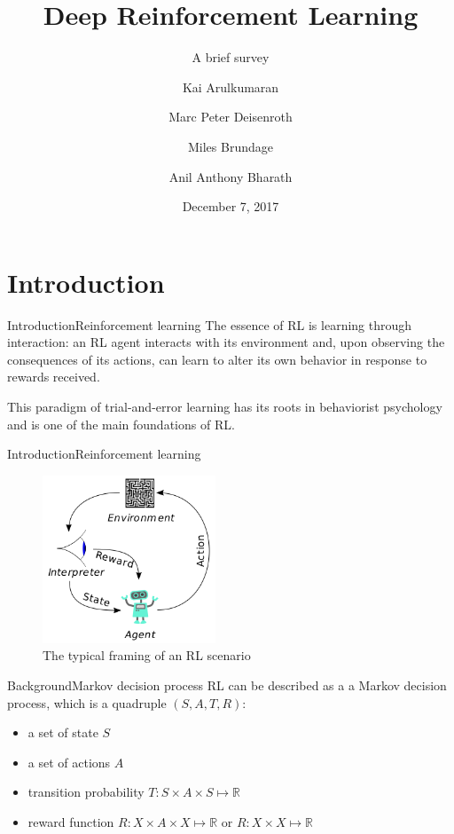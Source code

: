 \documentclass{beamer}
\title[Deep Reinforcement Learning --- A brief survey]{Deep Reinforcement Learning}
\subtitle{A brief survey}
\institute{}
\author[Delivered by Chen Shaoyuan]{Kai Arulkumaran \and Marc Peter Deisenroth \and Miles Brundage \and Anil Anthony Bharath}
\date{December 7, 2017}
\begin{document}
  \begin{frame}
    \titlepage
  \end{frame}

  \section{Introduction}
  \begin{frame}{Introduction}{Reinforcement learning}
    The essence of RL is learning through interaction: an RL agent interacts with its environment and, upon observing the consequences of its actions, can learn to alter its own behavior in response to rewards received.

    This paradigm of trial-and-error learning has its roots in behaviorist psychology and is one of the main foundations of RL.
  \end{frame}
  
  \begin{frame}{Introduction}{Reinforcement learning}
    \begin{figure}
      \includegraphics[height = 5cm]{RL_paradigm.png}
      \caption{The typical framing of an RL scenario}
    \end{figure}
  \end{frame}

  \begin{frame}{Background}{Markov decision process}
    RL can be described as a a Markov decision process, which is a quadruple $(S, A, T, R)$:
    \begin{itemize}
      \item a set of state $S$
      \item a set of actions $A$
      \item transition probability $T: S \times A \times S \mapsto \mathbb{R}$
      \item reward function $R: X \times A \times X \mapsto \mathbb{R}$
            or $R: X \times X \mapsto \mathbb{R}$
    \end{itemize}
  \end{frame}
\end{document}
